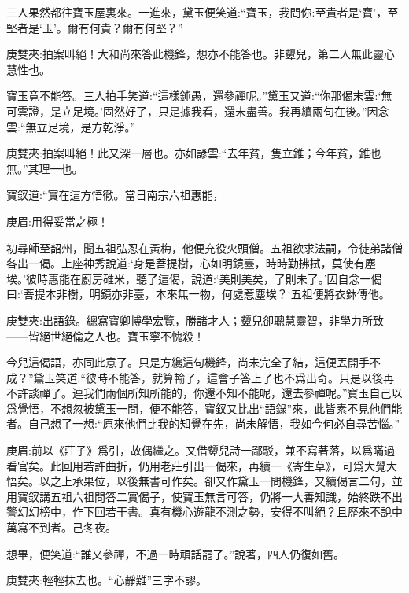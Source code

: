 \begin{parag}
    三人果然都往寶玉屋裏來。一進來，黛玉便笑道:“寶玉，我問你:至貴者是‘寶’，至堅者是‘玉’。爾有何貴？爾有何堅？”\begin{note}庚雙夾:拍案叫絕！大和尚來答此機鋒，想亦不能答也。非顰兒，第二人無此靈心慧性也。\end{note}寶玉竟不能答。三人拍手笑道:“這樣鈍愚，還參禪呢。”黛玉又道:“你那偈末雲:‘無可雲證，是立足境。’固然好了，只是據我看，還未盡善。我再續兩句在後。”因念雲:“無立足境，是方乾淨。”\begin{note}庚雙夾:拍案叫絕！此又深一層也。亦如諺雲:“去年貧，隻立錐；今年貧，錐也無。”其理一也。\end{note}寶釵道:“實在這方悟徹。當日南宗六祖惠能，\begin{note}庚眉:用得妥當之極！\end{note}初尋師至韶州，聞五祖弘忍在黃梅，他便充役火頭僧。五祖欲求法嗣，令徒弟諸僧各出一偈。上座神秀說道:‘身是菩提樹，心如明鏡臺，時時勤拂拭，莫使有塵埃。’彼時惠能在廚房碓米，聽了這偈，說道:‘美則美矣，了則未了。’因自念一偈曰:‘菩提本非樹，明鏡亦非臺，本來無一物，何處惹塵埃？‘五祖便將衣鉢傳他。\begin{note}庚雙夾:出語錄。總寫寶卿博學宏覽，勝諸才人；顰兒卻聰慧靈智，非學力所致——皆絕世絕倫之人也。寶玉寧不愧殺！\end{note}今兒這偈語，亦同此意了。只是方纔這句機鋒，尚未完全了結，這便丟開手不成？”黛玉笑道:“彼時不能答，就算輸了，這會子答上了也不爲出奇。只是以後再不許談禪了。連我們兩個所知所能的，你還不知不能呢，還去參禪呢。”寶玉自己以爲覺悟，不想忽被黛玉一問，便不能答，寶釵又比出“語錄”來，此皆素不見他們能者。自己想了一想:“原來他們比我的知覺在先，尚未解悟，我如今何必自尋苦惱。”\begin{note}庚眉:前以《莊子》爲引，故偶繼之。又借顰兒詩一鄙駁，兼不寫著落，以爲瞞過看官矣。此回用若許曲折，仍用老莊引出一偈來，再續一《寄生草》，可爲大覺大悟矣。以之上承果位，以後無書可作矣。卻又作黛玉一問機鋒，又續偈言二句，並用寶釵講五祖六祖問答二實偈子，使寶玉無言可答，仍將一大善知識，始終跌不出警幻幻榜中，作下回若干書。真有機心遊龍不測之勢，安得不叫絕？且歷來不說中萬寫不到者。己冬夜。\end{note}想畢，便笑道:“誰又參禪，不過一時頑話罷了。”說著，四人仍復如舊。\begin{note}庚雙夾:輕輕抹去也。“心靜難”三字不謬。\end{note}
\end{parag}


